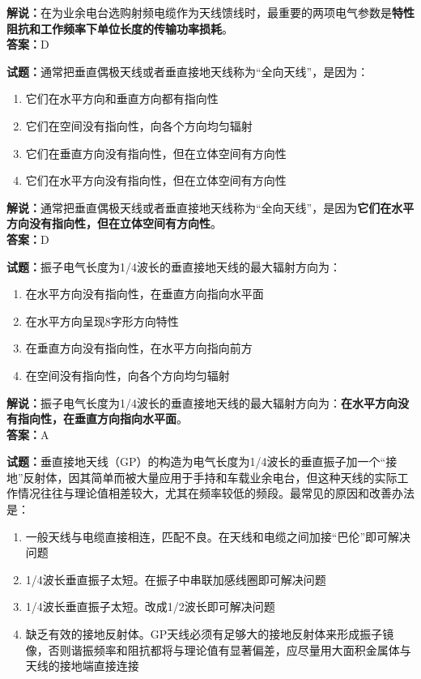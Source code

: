 \documentclass{ctexbook}
\begin{document}
\noindent\textbf{解说：}在为业余电台选购射频电缆作为天线馈线时，最重要的两项电气参数是\textbf{特性阻抗和工作频率下单位长度的传输功率损耗}。\\\noindent\textbf{答案：}D%

\bigskip

\noindent\textbf{试题：}通常把垂直偶极天线或者垂直接地天线称为“全向天线”，是因为：

\begin{enumerate}[leftmargin=3em]
  \item 它们在水平方向和垂直方向都有指向性
  \item 它们在空间没有指向性，向各个方向均匀辐射
  \item 它们在垂直方向没有指向性，但在立体空间有方向性
  \item 它们在水平方向没有指向性，但在立体空间有方向性
\end{enumerate}

\noindent\textbf{解说：}通常把垂直偶极天线或者垂直接地天线称为“全向天线”，是因为\textbf{它们在水平方向没有指向性，但在立体空间有方向性}。\\\noindent\textbf{答案：}D%

\bigskip

\noindent\textbf{试题：}振子电气长度为1/4波长的垂直接地天线的最大辐射方向为：

\begin{enumerate}[leftmargin=3em]
  \item 在水平方向没有指向性，在垂直方向指向水平面
  \item 在水平方向呈现8字形方向特性
  \item 在垂直方向没有指向性，在水平方向指向前方
  \item 在空间没有指向性，向各个方向均匀辐射
\end{enumerate}

\noindent\textbf{解说：}振子电气长度为1/4波长的垂直接地天线的最大辐射方向为：\textbf{在水平方向没有指向性，在垂直方向指向水平面}。\\\noindent\textbf{答案：}A%

\bigskip

\noindent\textbf{试题：}垂直接地天线（GP）的构造为电气长度为1/4波长的垂直振子加一个“接地”反射体，因其简单而被大量应用于手持和车载业余电台，但这种天线的实际工作情况往往与理论值相差较大，尤其在频率较低的频段。最常见的原因和改善办法是：

\begin{enumerate}[leftmargin=3em]
  \item 一般天线与电缆直接相连，匹配不良。在天线和电缆之间加接“巴伦”即可解决问题%
  \item 1/4波长垂直振子太短。在振子中串联加感线圈即可解决问题
  \item 1/4波长垂直振子太短。改成1/2波长即可解决问题
  \item 缺乏有效的接地反射体。GP天线必须有足够大的接地反射体来形成振子镜像，否则谐振频率和阻抗都将与理论值有显著偏差，应尽量用大面积金属体与天线的接地端直接连接
\end{enumerate}
\end{document}
